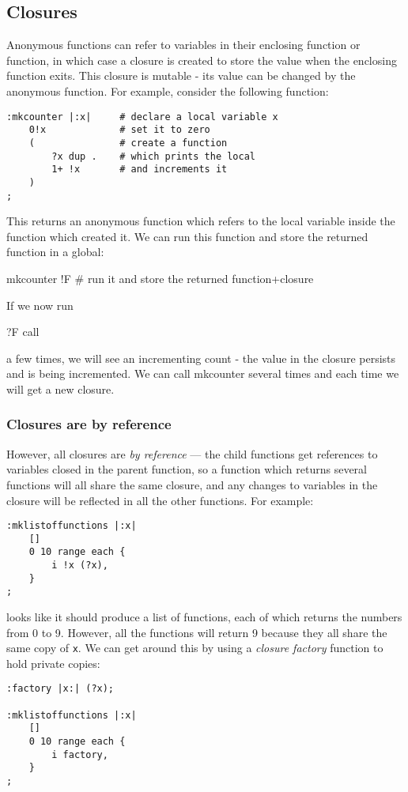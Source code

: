 \subsection{Closures}
Anonymous functions can refer to variables in their enclosing function or
function, in which case a closure is created to store the value when the enclosing
function exits. This closure is mutable - its value can be changed by the
anonymous function. For example, consider the following function:

\begin{lstlisting}
:mkcounter |:x|     # declare a local variable x
    0!x             # set it to zero
    (               # create a function
        ?x dup .    # which prints the local
        1+ !x       # and increments it
    )
;
\end{lstlisting}
This returns an anonymous function which refers to the local variable
inside the function which created it. We can run this function
and store the returned function in a global:

\begin{v}
mkcounter !F    # run it and store the returned function+closure
\end{v}
If we now run
\begin{v}
    ?F call
\end{v}
a few times, we will see an incrementing count - the value in the closure
persists and is being incremented. We can call mkcounter several times and
each time we will get a new closure.

\subsubsection{Closures are by reference}
However, all closures are \emph{by reference} --- the child functions
get references to variables closed in the parent function, so a function
which returns several functions will all share the same closure, and
any changes to variables in the closure will be reflected in all the 
other functions. For example:
\begin{lstlisting}
:mklistoffunctions |:x|
    []
    0 10 range each {
        i !x (?x),
    }
;
\end{lstlisting}
looks like it should produce a list of functions, each of which
returns the numbers from 0 to 9. However, all the functions will
return 9 because they all share the same copy of \texttt{x}.
We can get around this by using a \emph{closure factory} function to hold
private copies:
\begin{lstlisting}
:factory |x:| (?x);

:mklistoffunctions |:x|
    []
    0 10 range each {
        i factory,
    }
;

\end{lstlisting}

